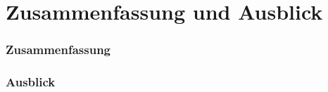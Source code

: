 \chapter{Zusammenfassung und Ausblick} \label{Zusammenfassung und Ausblick}
\subsection{Zusammenfassung}
\subsection{Ausblick}